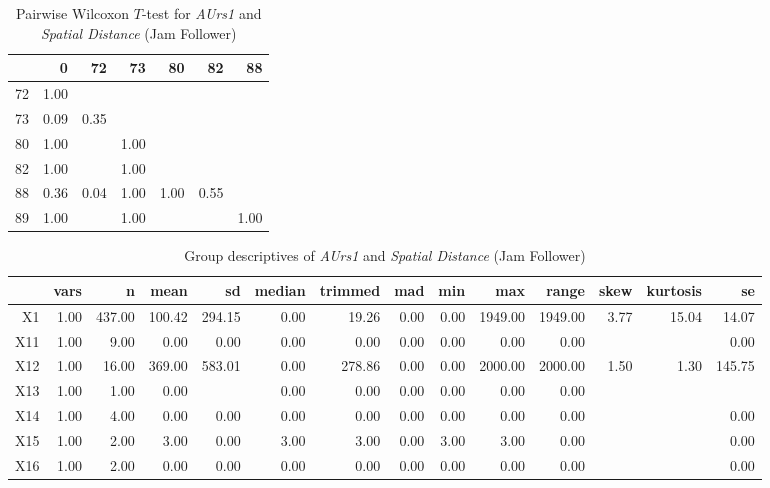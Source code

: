 \begin{table}[ht]
	\tiny
	\centering
	\begin{tabular}{rrrrrrr}
		\hline
		& 0 & 72 & 73 & 80 & 82 & 88 \\ 
		\hline
		72 & 1.00 &  &  &  &  &  \\ 
		73 & 0.09 & 0.35 &  &  &  &  \\ 
		80 & 1.00 &  & 1.00 &  &  &  \\ 
		82 & 1.00 &  & 1.00 &  &  &  \\ 
		88 & 0.36 & 0.04 & 1.00 & 1.00 & 0.55 &  \\ 
		89 & 1.00 &  & 1.00 &  &  & 1.00 \\ 
		\hline
	  \end{tabular}
    \caption{Pairwise Wilcoxon $T$-test for \textit{AUrs1} and \textit{Spatial Distance} (Jam Follower)}
    \label{tbl:wilcoxon_baysis_follower_AUrs1_SDist}
\end{table}
\begin{table}[ht]
	\tiny
	\centering
	\begin{tabular}{rrrrrrrrrrrrrr}
		\hline
		& vars & n & mean & sd & median & trimmed & mad & min & max & range & skew & kurtosis & se \\ 
		\hline
		X1 & 1.00 & 437.00 & 100.42 & 294.15 & 0.00 & 19.26 & 0.00 & 0.00 & 1949.00 & 1949.00 & 3.77 & 15.04 & 14.07 \\ 
		X11 & 1.00 & 9.00 & 0.00 & 0.00 & 0.00 & 0.00 & 0.00 & 0.00 & 0.00 & 0.00 &  &  & 0.00 \\ 
		X12 & 1.00 & 16.00 & 369.00 & 583.01 & 0.00 & 278.86 & 0.00 & 0.00 & 2000.00 & 2000.00 & 1.50 & 1.30 & 145.75 \\ 
		X13 & 1.00 & 1.00 & 0.00 &  & 0.00 & 0.00 & 0.00 & 0.00 & 0.00 & 0.00 &  &  &  \\ 
		X14 & 1.00 & 4.00 & 0.00 & 0.00 & 0.00 & 0.00 & 0.00 & 0.00 & 0.00 & 0.00 &  &  & 0.00 \\ 
		X15 & 1.00 & 2.00 & 3.00 & 0.00 & 3.00 & 3.00 & 0.00 & 3.00 & 3.00 & 0.00 &  &  & 0.00 \\ 
		X16 & 1.00 & 2.00 & 0.00 & 0.00 & 0.00 & 0.00 & 0.00 & 0.00 & 0.00 & 0.00 &  &  & 0.00 \\ 
		\hline
	  \end{tabular}
    \caption{Group descriptives of \textit{AUrs1} and \textit{Spatial Distance} (Jam Follower)}
    \label{tbl:descriptives_baysis_follower_AUrs1_SDist}
\end{table}

